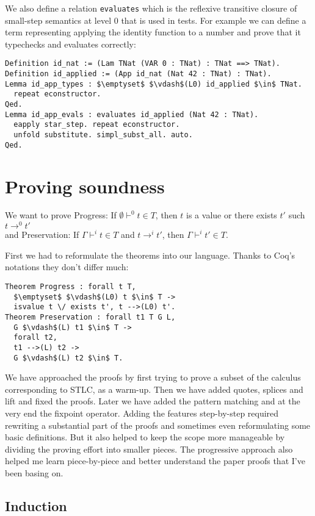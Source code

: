 \documentclass[runningheads]{article}
\begin{document}
We also define a relation \texttt{evaluates} which is the reflexive transitive closure of small-step semantics at level 0 that is used in tests. For example we can define a term representing applying the identity function to a number and prove that it typechecks and evaluates correctly:
\begin{lstlisting}[mathescape=true]
Definition id_nat := (Lam TNat (VAR 0 : TNat) : TNat ==> TNat).
Definition id_applied := (App id_nat (Nat 42 : TNat) : TNat).
Lemma id_app_types : $\emptyset$ $\vdash$(L0) id_applied $\in$ TNat.
  repeat econstructor.
Qed.
Lemma id_app_evals : evaluates id_applied (Nat 42 : TNat).
  eapply star_step. repeat econstructor.
  unfold substitute. simpl_subst_all. auto.
Qed.
\end{lstlisting}



\section{Proving soundness}
We want to prove Progress: If $\emptyset \vdash^0 t \in T$, then $t$ is a value or there exists $t'$ such $t \longrightarrow^0 t'$
\\
and Preservation: If $\Gamma \vdash^i t \in T$ and $t \longrightarrow^i t'$, then $\Gamma \vdash^i t' \in T$.


First we had to reformulate the theorems into our language. Thanks to Coq's notations they don't differ much:
\begin{lstlisting}[mathescape=true]
Theorem Progress : forall t T,
  $\emptyset$ $\vdash$(L0) t $\in$ T ->
  isvalue t \/ exists t', t -->(L0) t'.
Theorem Preservation : forall t1 T G L,
  G $\vdash$(L) t1 $\in$ T ->
  forall t2,
  t1 -->(L) t2 ->
  G $\vdash$(L) t2 $\in$ T.
\end{lstlisting}

We have approached the proofs by first trying to prove a subset of the calculus corresponding to STLC, as a warm-up. Then we have added quotes, splices and lift and fixed the proofs. Later we have added the pattern matching and at the very end the fixpoint operator. Adding the features step-by-step required rewriting a substantial part of the proofs and sometimes even reformulating some basic definitions. But it also helped to keep the scope more manageable by dividing the proving effort into smaller pieces. The progressive approach also helped me learn piece-by-piece and better understand the paper proofs that I've been basing on.

\subsection{Induction}
\end{document}
